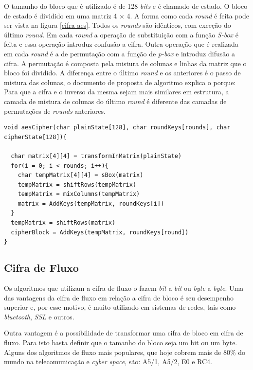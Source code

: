 O tamanho do bloco que é utilizado é de 128 \textit{bits} e é chamado de estado. O bloco de estado é dividido em uma matriz 4 $\times$ 4. A forma como cada \textit{round} é feita pode ser vista na figura \ref{cifra-aes}. Todos os \textit{rounds} são idênticos, com exceção do último \textit{round}. Em cada \textit{round} a operação de substituição com a função \textit{S-box} é feita e essa operação introduz confusão a cifra. Outra operação que é realizada em cada \textit{round} é a de permutação com a função de \textit{p-box} e introduz difusão a cifra. A permutação é composta pela mistura de colunas e linhas da matriz que o bloco foi dividido. A diferença entre o último \textit{round} e os anteriores é o passo de mistura das colunas, o documento de proposta de algoritmo explica o porque: Para que a cifra e o inverso da mesma sejam mais similares em estrutura, a camada de mistura de colunas do último \textit{round} é diferente das camadas de permutações de \textit{rounds} anteriores.\cite{aes-proposal}

    \begin{lstlisting}[caption={Pseudo-código AES}, label=aes-pseudo-code]
void aesCipher(char plainState[128], char roundKeys[rounds], char cipherState[128]){

  char matrix[4][4] = transformInMatrix(plainState)
  for(i = 0; i < rounds; i++){
	char tempMatrix[4][4] = sBox(matrix)   
	tempMatrix = shiftRows(tempMatrix) 
	tempMatrix = mixColumns(tempMatrix)
	matrix = AddKeys(tempMatrix, roundKeys[i])
  }
  tempMatrix = shiftRows(matrix)
  cipherBlock = AddKeys(tempMatrix, roundKeys[round])
}
    \end{lstlisting}

\subsection{Cifra de Fluxo}
\label{stream-cipher}

Os algoritmos que utilizam a cifra de fluxo o fazem \textit{bit} a \textit{bit} ou \textit{byte} a \textit{byte}. Uma das vantagens da cifra de fluxo em relação a cifra de bloco é seu desempenho superior e, por esse motivo, é muito utilizado em sistemas de redes, tais como \textit{bluetooth}, \textit{SSL} e outros. 

Outra vantagem é a possibilidade de transformar uma cifra de bloco em cifra de fluxo. Para isto basta definir que o tamanho do bloco seja um bit ou um byte. Alguns dos algoritmos de fluxo mais populares, que hoje cobrem mais de 80\% do mundo na telecomunicação e \textit{cyber space}, são: A5/1, A5/2, E0 e RC4. ~\cite{majid-mohd}

